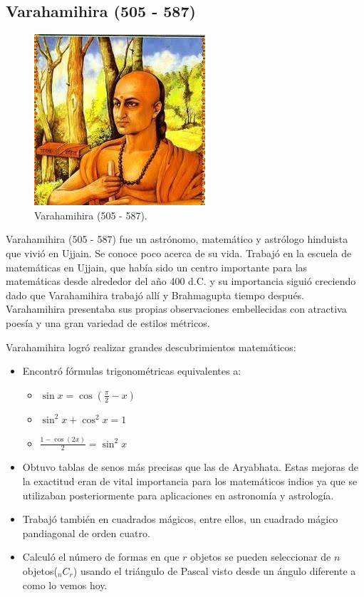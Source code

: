 \documentclass[a4paper, 11pt]{article}
\begin{document}
	\subsection{Varahamihira (505 - 587)}
		\begin{figure}[!ht]
			\centering
			\includegraphics{varahamihira.jpg}
			\caption{Varahamihira (505 - 587).}
			\label{fig:varahamihira}
		\end{figure}

		Varahamihira (505 - 587) fue un astrónomo, matemático y astrólogo hinduista que vivió en Ujjain. Se conoce poco
		acerca de su vida. Trabajó en la escuela de matemáticas en Ujjain, que había sido un centro importante para
		las matemáticas desde alrededor del año 400 d.C. y su importancia siguió creciendo dado que Varahamihira trabajó
		allí y Brahmagupta tiempo después. Varahamihira presentaba sus propias observaciones embellecidas con atractiva
		poesía y una gran variedad de estilos métricos.
		
		Varahamihira logró realizar grandes descubrimientos matemáticos:
		\begin{itemize}
			\item Encontró fórmulas trigonométricas equivalentes a:
					\begin{itemize}
						\item $\displaystyle \sin x = \cos \left(\frac{\pi}{2} - x \right)$
						\item $\displaystyle \sin^2 x + \cos^2 x = 1$
						\item $\displaystyle \frac{1 - \cos(2x)}{2} = \sin^2 x$
					\end{itemize}
			\item Obtuvo tablas de senos más precisas que las de Aryabhata. Estas mejoras de la exactitud eran de vital
			importancia para los matemáticos indios ya que se utilizaban posteriormente para aplicaciones en astronomía
			y astrología.
			\item Trabajó también en cuadrados mágicos, entre ellos, un cuadrado mágico pandiagonal de orden cuatro.
			\item Calculó el número de formas en que $r$ objetos se pueden seleccionar de $n$ objetos($_n C_r$) usando
			el triángulo de Pascal visto desde un ángulo diferente a como lo vemos hoy.
		\end{itemize}
\end{document}
